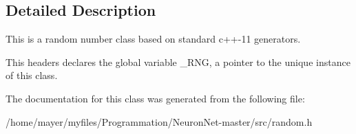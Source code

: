 \subsection{Detailed Description}
This is a random number class based on standard c++-\/11 generators.

This headers declares the global variable \+\_\+\+R\+NG, a pointer to the unique instance of this class. 

The documentation for this class was generated from the following file\+:\begin{DoxyCompactItemize}
\item 
/home/mayer/myfiles/\+Programmation/\+Neuron\+Net-\/master/src/random.\+h\end{DoxyCompactItemize}
